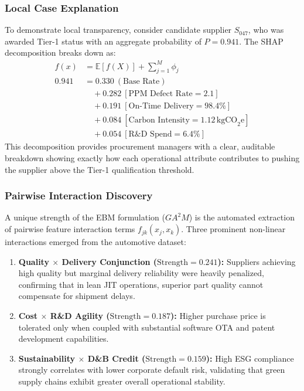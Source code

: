\documentclass[twocolumn,10pt]{article}
\begin{document}
\subsubsection{Local Case Explanation}
To demonstrate local transparency, consider candidate supplier $S_{047}$, who was awarded Tier-1 status with an aggregate probability of $P = 0.941$. The SHAP decomposition breaks down as:
\begin{align*}
    f(x) &= \mathbb{E}[f(X)] + \sum_{j=1}^M \phi_j \\
    0.941 &= 0.330 \ (\text{Base Rate}) \\
    &\quad + 0.282 \ [\text{PPM Defect Rate} = 2.1] \\
    &\quad + 0.191 \ [\text{On-Time Delivery} = 98.4\%] \\
    &\quad + 0.084 \ [\text{Carbon Intensity} = 1.12 \, \text{kgCO}_2\text{e}] \\
    &\quad + 0.054 \ [\text{R\&D Spend} = 6.4\%]
\end{align*}
This decomposition provides procurement managers with a clear, auditable breakdown showing exactly how each operational attribute contributes to pushing the supplier above the Tier-1 qualification threshold.

\subsubsection{Pairwise Interaction Discovery}
A unique strength of the EBM formulation ($GA^2M$) is the automated extraction of pairwise feature interaction terms $f_{jk}(x_j, x_k)$. Three prominent non-linear interactions emerged from the automotive dataset:
\begin{enumerate}
    \item \textbf{Quality $\times$ Delivery Conjunction ($\text{Strength} = 0.241$):} Suppliers achieving high quality but marginal delivery reliability were heavily penalized, confirming that in lean JIT operations, superior part quality cannot compensate for shipment delays.
    \item \textbf{Cost $\times$ R\&D Agility ($\text{Strength} = 0.187$):} Higher purchase price is tolerated only when coupled with substantial software OTA and patent development capabilities.
    \item \textbf{Sustainability $\times$ D\&B Credit ($\text{Strength} = 0.159$):} High ESG compliance strongly correlates with lower corporate default risk, validating that green supply chains exhibit greater overall operational stability.
\end{enumerate}
\end{document}

